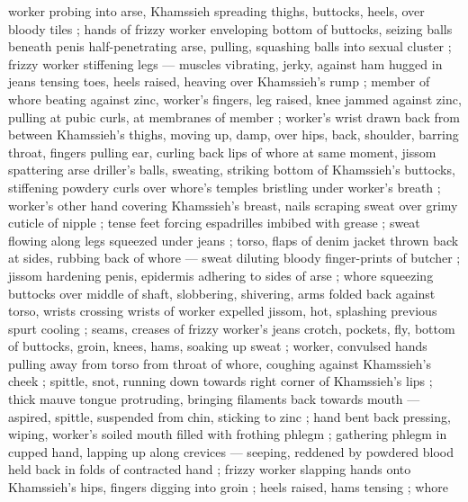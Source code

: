 worker probing into arse, Khamssieh spreading thighs, buttocks, heels, over bloody tiles ; hands of frizzy worker enveloping bottom of buttocks, seizing balls beneath penis half-penetrating arse, pulling, squashing balls into sexual cluster ; frizzy worker stiffening legs --- muscles vibrating, jerky, against ham hugged in jeans {\dashcom} tensing toes, heels raised, heaving over Khamssieh's rump ; member of whore beating against zinc, worker's fingers, leg raised, knee jammed against zinc, pulling at pubic curls, at membranes of member ; worker's wrist drawn back from between Khamssieh's thighs, moving up, damp, over hips, back, shoulder, barring throat, fingers pulling ear, curling back lips of whore {\col} at same moment, jissom spattering arse {\col} driller's balls, sweating, striking bottom of Khamssieh's buttocks, stiffening powdery curls over whore's temples bristling under worker's breath ; worker's other hand covering Khamssieh's breast, nails scraping sweat over grimy cuticle of nipple ; tense feet forcing espadrilles imbibed with grease ; sweat flowing along legs squeezed under jeans ; torso, flaps of denim jacket thrown back at sides, rubbing back of whore --- sweat diluting bloody finger-prints of butcher ; jissom hardening penis, epidermis adhering to sides of arse ; whore squeezing buttocks over middle of shaft, slobbering, shivering, arms folded back against torso, wrists crossing wrists of worker {\col} expelled jissom, hot, splashing previous spurt cooling ; seams, creases of frizzy worker's jeans {\col} crotch, pockets, fly, bottom of buttocks, groin, knees, hams, soaking up sweat ; worker, convulsed hands pulling away from torso from throat of whore, coughing against Khamssieh's cheek ; spittle, snot, running down towards right corner of Khamssieh's lips ; thick mauve tongue protruding, bringing filaments back towards mouth --- aspired, spittle, suspended from chin, sticking to zinc ; hand bent back pressing, wiping, worker's soiled mouth filled with frothing phlegm ; gathering phlegm in cupped hand, lapping up along crevices --- seeping, reddened by powdered blood held back in folds of contracted hand ; frizzy worker slapping hands onto Khamssieh's hips, fingers digging into groin ; heels raised, hams tensing ; whore 
